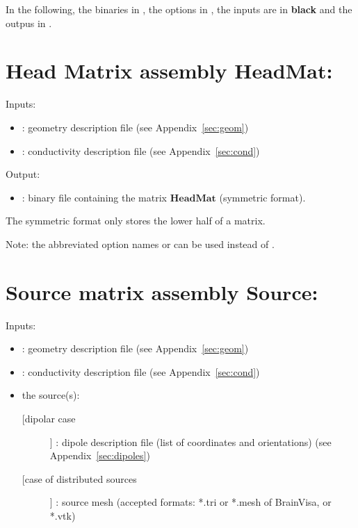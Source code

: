 \noindent
In the following, the binaries in , the options in , the inputs are in  \textbf{black} and the outpus in  . 

\section{Head Matrix assembly $\mathbf{HeadMat}$:}
\label{sect: command assemble HeadMat}

\noindent
Inputs: 
\begin{itemize}
    \item {}: geometry description file (see Appendix~\ref{sec:geom})
    \item {}: conductivity description file (see Appendix~\ref{sec:cond})
\end{itemize}

\noindent
Output:
\begin{itemize}
    \item {}: binary file containing the matrix $\mathbf{HeadMat}$ (symmetric format).
\end{itemize}
The symmetric format only stores the lower half of a matrix.
\medskip

\noindent
{}
\medskip
Note: the abbreviated option names  or  can be used instead of .

\section{Source matrix assembly $\mathbf{Source}$:}
\label{sect: command assemble SourceMat}

\noindent
Inputs: 
\begin{itemize}
    \item {}: geometry description file (see Appendix~\ref{sec:geom})
    \item {}: conductivity description file (see Appendix~\ref{sec:cond})
    \item the source(s):
        \begin{description}
            \item [[dipolar case]] : dipole description file (list of coordinates and orientations)
                                    (see Appendix~\ref{sec:dipoles}) 
            \item [[case of distributed sources]]  : source mesh (accepted formats:  *.tri or *.mesh of BrainVisa, or *.vtk) 
        \end{description}
\end{itemize}

